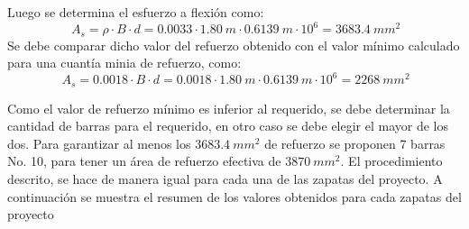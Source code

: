 \documentclass[12pt]{article}
\begin{document}
Luego se determina el esfuerzo a flexión como:
\begin{equation*}
    \ A_{s}=\rho\cdot B\cdot d=0.0033\cdot 1.80~m\cdot 0.6139~m\cdot 10^6=3683.4~mm^2
\end{equation*}
Se debe comparar dicho valor del refuerzo obtenido con el valor mínimo calculado para una cuantía minia de refuerzo, como:
\begin{equation*}
    \ A_{s}=0.0018 \cdot B\cdot d=0.0018\cdot 1.80~m\cdot 0.6139~m\cdot 10^6=2268~mm^2
\end{equation*}

Como el valor de refuerzo mínimo es inferior al requerido, se debe determinar la cantidad de barras para el requerido, en otro caso se debe elegir el mayor de los dos. Para garantizar al menos los $3683.4~mm^2$ de refuerzo se proponen 7 barras No. 10, para tener un área de refuerzo efectiva de $3870~mm^2$.
El procedimiento descrito, se hace de manera igual para cada una de las zapatas del proyecto. A continuación se muestra el resumen de los valores obtenidos para cada zapatas del proyecto

\end{document}
